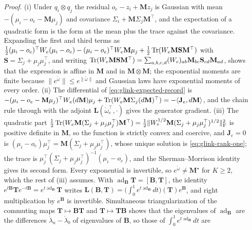 \noindent\emph{Proof.}
(i) Under \(q_i\otimes q_j\) the residual \(o_e-z_i+\mathbf Mz_j\) is Gaussian with mean
\(-(\mu_i-o_e-\mathbf M\mu_j)\) and covariance \(\Sigma_i+\mathbf M\Sigma_j\mathbf M^\top\), and the
expectation of a quadratic form is the form at the mean plus the trace against the covariance.
Expanding the first and third terms as
\(\tfrac12(\mu_i-o_e)^\top W_e(\mu_i-o_e)-(\mu_i-o_e)^\top W_e\mathbf M\mu_j+\tfrac12\operatorname{Tr}(W_e\mathbf M\mathbf S\mathbf M^\top)\)
with \(\mathbf S=\Sigma_j+\mu_j\mu_j^\top\), and writing
\(\operatorname{Tr}(W_e\mathbf M\mathbf S\mathbf M^\top)=\sum_{a,b,c,d}(W_e)_{ab}\mathbf M_{bc}\mathbf S_{cd}\mathbf M_{ad}\), shows that the
expression is affine in \(\mathbf M\) and in \(\mathbf M\otimes\mathbf M\); the exponential moments are
finite because \(\lVert e^{\mathring\omega}\rVert\leq e^{\lVert\mathring\omega\rVert}\) and Gaussian laws
have exponential moments of every order.
(ii) The differential of \eqref{eq:glink-expected-record} is
\(-(\mu_i-o_e-\mathbf M\mu_j)^\top W_e(d\mathbf M)\mu_j+\operatorname{Tr}(W_e\mathbf M\Sigma_j(d\mathbf M)^\top)=-\langle\mathbf J_e,d\mathbf M\rangle\),
and the chain rule through  with the adjoint
\(\mathbf L(\mathring\omega_e^\top,\cdot)\) gives the generator gradient.
(iii) The quadratic part
\(\tfrac12\operatorname{Tr}(W_e\mathbf M(\Sigma_j+\mu_j\mu_j^\top)\mathbf M^\top)
=\tfrac12\lVert W_e^{1/2}\mathbf M(\Sigma_j+\mu_j\mu_j^\top)^{1/2}\rVert_{\mathrm F}^2\) is positive definite
in \(\mathbf M\), so the function is strictly convex and coercive, and \(\mathbf J_e=0\) is
\((\mu_i-o_e)\mu_j^\top=\mathbf M(\Sigma_j+\mu_j\mu_j^\top)\), whose unique solution is
\eqref{eq:glink-rank-one}; the trace is \(\mu_j^\top(\Sigma_j+\mu_j\mu_j^\top)^{-1}(\mu_i-o_e)\), and the
Sherman--Morrison identity gives its second form. Every exponential is invertible, so
\(e^{\mathring\omega}\neq\mathbf M^\star\) for \(K\geq2\), which the rest of (iii) assumes. With
\(\operatorname{ad}_{\mathbf B}\mathbf T=[\mathbf B,\mathbf T]\), the identity
\(e^{t\mathbf B}\mathbf Te^{-t\mathbf B}=e^{t\operatorname{ad}_{\mathbf B}}\mathbf T\) writes
\(\mathbf L(\mathbf B,\mathbf T)=\bigl(\int_0^1e^{t\operatorname{ad}_{\mathbf B}}dt\bigr)(\mathbf T)e^{\mathbf B}\), and right
multiplication by \(e^{\mathbf B}\) is invertible. Simultaneous triangularization of the commuting maps
\(\mathbf T\mapsto\mathbf B\mathbf T\) and \(\mathbf T\mapsto\mathbf T\mathbf B\) shows that the eigenvalues of
\(\operatorname{ad}_{\mathbf B}\) are the differences \(\mathring\lambda_a-\mathring\lambda_b\) of eigenvalues of
\(\mathbf B\), so those of \(\int_0^1e^{t\operatorname{ad}_{\mathbf B}}dt\) are
